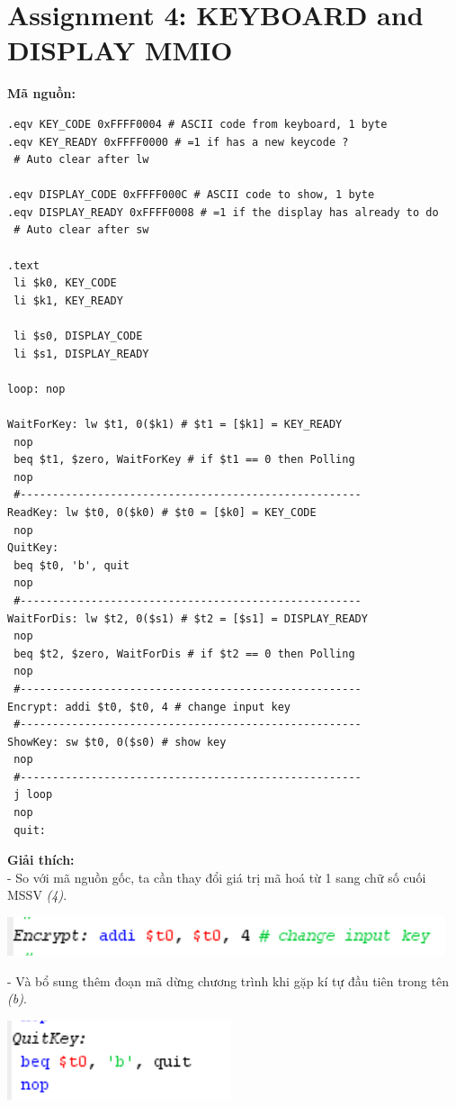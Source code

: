 \documentclass[12pt,a4paper,oneside]{article}
\begin{document}
\section*{Assignment 4: KEYBOARD and DISPLAY MMIO}
\textbf{Mã nguồn:}
\begin{lstlisting}
.eqv KEY_CODE 0xFFFF0004 # ASCII code from keyboard, 1 byte
.eqv KEY_READY 0xFFFF0000 # =1 if has a new keycode ?
 # Auto clear after lw

.eqv DISPLAY_CODE 0xFFFF000C # ASCII code to show, 1 byte
.eqv DISPLAY_READY 0xFFFF0008 # =1 if the display has already to do
 # Auto clear after sw

.text
 li $k0, KEY_CODE
 li $k1, KEY_READY
 
 li $s0, DISPLAY_CODE
 li $s1, DISPLAY_READY

loop: nop
 
WaitForKey: lw $t1, 0($k1) # $t1 = [$k1] = KEY_READY
 nop
 beq $t1, $zero, WaitForKey # if $t1 == 0 then Polling
 nop
 #-----------------------------------------------------
ReadKey: lw $t0, 0($k0) # $t0 = [$k0] = KEY_CODE
 nop
QuitKey:
 beq $t0, 'b', quit
 nop
 #-----------------------------------------------------
WaitForDis: lw $t2, 0($s1) # $t2 = [$s1] = DISPLAY_READY
 nop
 beq $t2, $zero, WaitForDis # if $t2 == 0 then Polling 
 nop 
 #-----------------------------------------------------
Encrypt: addi $t0, $t0, 4 # change input key
 #-----------------------------------------------------
ShowKey: sw $t0, 0($s0) # show key
 nop 
 #----------------------------------------------------- 
 j loop
 nop
 quit:
\end{lstlisting}
\pagebreak
\textbf{Giải thích:}\\
- So với mã nguồn gốc, ta cần thay đổi giá trị mã hoá từ 1 sang chữ số cuối MSSV \textit{(4)}.
\begin{center}
\includegraphics[scale=1]{8}
\end{center}
- Và bổ sung thêm đoạn mã dừng chương trình khi gặp kí tự đầu tiên trong tên \textit{(b)}.
\begin{center}
\includegraphics[scale=1]{10}
\end{center}
\end{document}
